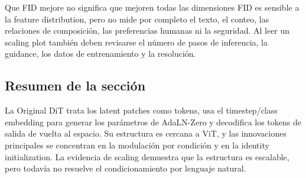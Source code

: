 \begin{warningbox}{Que FID mejore no significa que mejoren todas las dimensiones}
FID es sensible a la feature distribution, pero no mide por completo el texto, el conteo, las relaciones de composición, las preferencias humanas ni la seguridad. Al leer un scaling plot también deben revisarse el número de pasos de inferencia, la guidance, los datos de entrenamiento y la resolución.
\end{warningbox}

\subsection{Resumen de la sección}

La Original DiT trata los latent patches como tokens, usa el timestep/class embedding para generar los parámetros de AdaLN-Zero y decodifica los tokens de salida de vuelta al espacio. Su estructura es cercana a ViT, y las innovaciones principales se concentran en la modulación por condición y en la identity initialization. La evidencia de scaling demuestra que la estructura es escalable, pero todavía no resuelve el condicionamiento por lenguaje natural.
